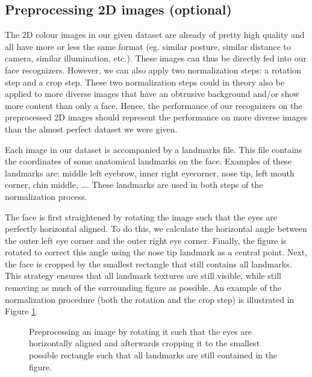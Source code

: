\documentclass[]{article}
\begin{document}
\subsection{Preprocessing 2D images (optional)}
The 2D colour images in our given dataset are already of pretty high quality and all have more or less the same format (eg. similar posture, similar distance to camera, similar illumination, etc.). These images can thus be directly fed into our face recognizers. However, we can also apply two normalization steps: a rotation step and a crop step. These two normalization steps could in theory also be applied to more diverse images that have an obtrusive background and/or show more content than only a face. Hence, the performance of our recognizers on the preprocessed 2D images should represent the performance on more diverse images than the almost perfect dataset we were given.

Each image in our dataset is accompanied by a landmarks file. This file contains the coordinates of some anatomical landmarks on the face. Examples of these landmarks are: middle left eyebrow, inner right eyecorner, nose tip, left mouth corner, chin middle, \dots . These landmarks are used in both steps of the normalization process.

The face is first straightened by rotating the image such that the eyes are perfectly horizontal aligned. To do this, we calculate the horizontal angle between the outer left eye corner and the outer right eye corner. Finally, the figure is rotated to correct this angle using the nose tip landmark as a central point. Next, the face is cropped by the smallest rectangle that still contains all landmarks. This strategy ensures that all landmark textures are still visible, while still removing as much of the surrounding figure as possible. An example of the normalization procedure (both the rotation and the crop step) is illustrated in Figure \ref{fig:preprocess}.
\clearpage
\begin{figure}
	\centering
	\caption{Preprocessing an image by rotating it such that the eyes are horizontally aligned and afterwards cropping it to the smallest possible rectangle such that all landmarks are still contained in the figure.}
	\label{fig:preprocess}
\end{figure}
\end{document}

